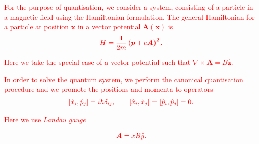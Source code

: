 \textcolor{red}{For the purpose of quantisation, we consider a system, consisting of a particle in a magnetic field using the Hamiltonian formulation. The general Hamiltonian for a particle at position $\bm{x}$ in a vector potential $\bm{A}(\bm{x})$ is }
\begin{align}
    \textcolor{red}{H=\frac{1}{2m}\left(\bm{p} +e \bm{A} \right)^2.}
\end{align}

 \textcolor{red}{Here we take the special case of a vector potential such that $\nabla \times \bm{A} = B \hat{\bm{z}}$.}

\textcolor{red}{In order to solve the quantum system, we perform the canonical quanti\textcolor{red}{s}ation procedure and we promote the positions and momenta to operators}
\begin{align}
    \textcolor{red}{[\hat{x}_i, \hat{p}_j] = i \hbar \delta_{ij}, \qquad [\hat{x}_i, \hat{x}_j]=[\hat{p}_i, \hat{p}_j]=0.}
\end{align}

\textcolor{red}{Here we use \textit{Landau gauge}}

\begin{align}
    \textcolor{red}{\bm{A}=  x B\hat{y}.}
\end{align}

